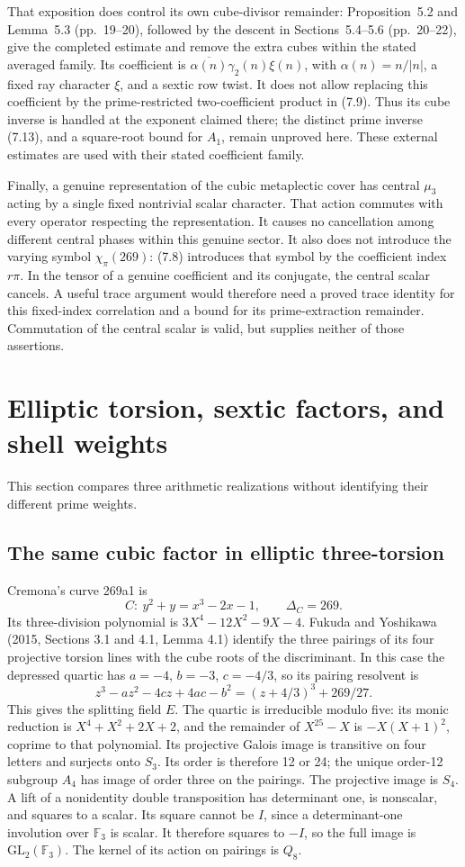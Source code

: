 \documentclass[11pt]{article}
\begin{document}
That exposition does control its own cube-divisor remainder: Proposition~5.2 and Lemma~5.3 (pp.~19--20), followed by the descent in Sections~5.4--5.6 (pp.~20--22), give the completed estimate and remove the extra cubes within the stated averaged family. Its coefficient is $\overline{\alpha(n)}\gamma_2(n)\xi(n)$, with $\alpha(n)=n/|n|$, a fixed ray character $\xi$, and a sextic row twist. It does not allow replacing this coefficient by the prime-restricted two-coefficient product in (7.9). Thus its cube inverse is handled at the exponent claimed there; the distinct prime inverse (7.13), and a square-root bound for $A_1$, remain unproved here. These external estimates are used with their stated coefficient family.

Finally, a genuine representation of the cubic metaplectic cover has central $\mu_3$ acting by a single fixed nontrivial scalar character. That action commutes with every operator respecting the representation. It causes no cancellation among different central phases within this genuine sector. It also does not introduce the varying symbol $\chi_\pi(269)$: (7.8) introduces that symbol by the coefficient index $r\pi$. In the tensor of a genuine coefficient and its conjugate, the central scalar cancels. A useful trace argument would therefore need a proved trace identity for this fixed-index correlation and a bound for its prime-extraction remainder. Commutation of the central scalar is valid, but supplies neither of those assertions.

\section{Elliptic torsion, sextic factors, and shell weights}
This section compares three arithmetic realizations without identifying their different prime weights.

\subsection{The same cubic factor in elliptic three-torsion}
Cremona's curve 269a1 is
\[
 C:\ y^2+y=x^3-2x-1,\qquad \Delta_C=269.
\]
Its three-division polynomial is $3X^4-12X^2-9X-4$. Fukuda and Yoshikawa (2015, Sections 3.1 and 4.1, Lemma 4.1) identify the three pairings of its four projective torsion lines with the cube roots of the discriminant. In this case the depressed quartic has $a=-4$, $b=-3$, $c=-4/3$, so its pairing resolvent is
\[
 z^3-az^2-4cz+4ac-b^2=(z+4/3)^3+269/27.
\]
This gives the splitting field $E$. The quartic is irreducible modulo five: its monic reduction is $X^4+X^2+2X+2$, and the remainder of $X^{25}-X$ is $-X(X+1)^2$, coprime to that polynomial. Its projective Galois image is transitive on four letters and surjects onto $S_3$. Its order is therefore 12 or 24; the unique order-12 subgroup $A_4$ has image of order three on the pairings. The projective image is $S_4$. A lift of a nonidentity double transposition has determinant one, is nonscalar, and squares to a scalar. Its square cannot be $I$, since a determinant-one involution over $\mathbb F_3$ is scalar. It therefore squares to $-I$, so the full image is $\mathrm{GL}_2(\mathbb F_3)$. The kernel of its action on pairings is $Q_8$.
\end{document}
